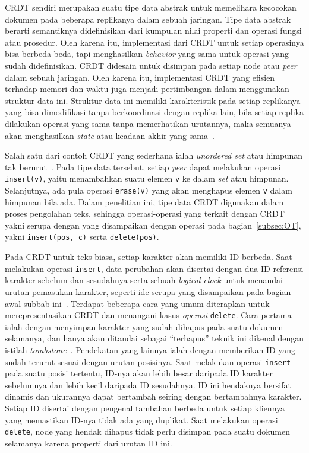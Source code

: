 CRDT sendiri merupakan suatu tipe data abstrak untuk memelihara kecocokan dokumen pada beberapa replikanya dalam sebuah jaringan. Tipe data abstrak berarti semantiknya didefinisikan dari kumpulan nilai properti dan operasi fungsi atau prosedur. Oleh karena itu, implementasi dari CRDT untuk setiap operasinya bisa berbeda-beda, tapi menghasilkan \textit{behavior} yang sama untuk operasi yang sudah didefinisikan. CRDT didesain untuk disimpan pada setiap node atau \textit{peer} dalam sebuah jaringan. Oleh karena itu, implementasi CRDT yang efisien terhadap memori dan waktu juga menjadi pertimbangan dalam menggunakan struktur data ini. Struktur data ini memiliki karakteristik pada setiap replikanya yang bisa dimodifikasi tanpa berkoordinasi dengan replika lain, bila setiap replika dilakukan operasi yang sama tanpa memerhatikan urutannya, maka semuanya akan menghasilkan \textit{state} atau keadaan akhir yang sama~\citep{Shapiro2011, CRDToverview2}.

Salah satu dari contoh CRDT yang sederhana ialah \textit{unordered set} atau himpunan tak berurut~\citep{Shapiro2011}. Pada tipe data tersebut, setiap \textit{peer} dapat melakukan operasi \texttt{insert(v)}, yaitu menambahkan suatu elemen \texttt{v} ke dalam \textit{set} atau himpunan. Selanjutnya, ada pula operasi \texttt{erase(v)} yang akan menghapus elemen \texttt{v} dalam himpunan bila ada. Dalam penelitian ini, tipe data CRDT digunakan dalam proses pengolahan teks, sehingga operasi-operasi yang terkait dengan CRDT yakni serupa dengan yang disampaikan dengan operasi pada bagian~\ref{subsec:OT}, yakni \texttt{insert(pos, c)} serta \texttt{delete(pos)}.

Pada CRDT untuk teks biasa, setiap karakter akan memiliki ID berbeda. Saat melakukan operasi \texttt{insert}, data perubahan akan disertai dengan dua ID referensi karakter sebelum dan sesudahnya serta sebuah \textit{logical clock} untuk menandai urutan pemasukan karakter, seperti ide serupa yang disampaikan pada bagian awal subbab ini~\citep{oster2005real}. Terdapat beberapa cara yang umum diterapkan untuk merepresentasikan CRDT dan menangani kasus \textit{operasi} \texttt{delete}. Cara pertama ialah dengan menyimpan karakter yang sudah dihapus pada suatu dokumen selamanya, dan hanya akan ditandai sebagai ``terhapus'' teknik ini dikenal dengan istilah \textit{tombstone}~\citep{molli2006tombstone}. Pendekatan yang lainnya ialah dengan memberikan ID yang sudah terurut sesuai dengan urutan posisinya. Saat melakukan operasi \texttt{insert} pada suatu posisi tertentu, ID-nya akan lebih besar daripada ID karakter sebelumnya dan lebih kecil daripada ID sesudahnya. ID ini hendaknya bersifat dinamis dan ukurannya dapat bertambah seiring dengan bertambahnya karakter. Setiap ID disertai dengan pengenal tambahan berbeda untuk setiap kliennya yang memastikan ID-nya tidak ada yang duplikat. Saat melakukan operasi \texttt{delete}, node yang hendak dihapus tidak perlu disimpan pada suatu dokumen selamanya karena properti dari urutan ID ini.

